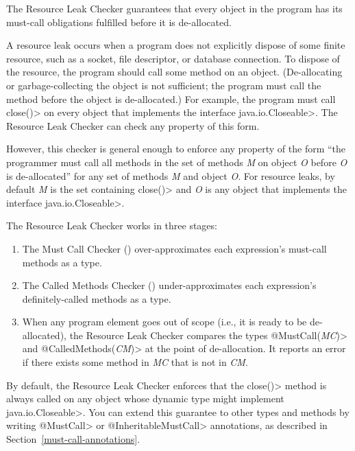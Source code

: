 \htmlhr
{}

The Resource Leak Checker guarantees that every object in the program has
its must-call obligations fulfilled before it is de-allocated.

A resource leak occurs when a program does not explicitly dispose of some
finite resource, such as a socket, file descriptor, or database connection.
To dispose of the resource, the program should call some method on an
object.  (De-allocating or garbage-collecting the object is not sufficient;
the program must call the method before the object is de-allocated.)  For
example, the program must call \<close()> on every object that implements
the interface \<java.io.Closeable>.  The Resource Leak Checker can check
any property of this form.

However, this checker
is general enough to enforce any property of the form ``the programmer must call
all methods in the set of methods \emph{M} on object \emph{O} before \emph{O}
is de-allocated'' for any set of methods \emph{M} and object \emph{O}.
For resource leaks, by default \emph{M} is the set containing \<close()> and \emph{O}
is any object that implements the interface \<java.io.Closeable>.

The Resource Leak Checker works in three stages:
\begin{enumerate}
\item The Must Call Checker ()
over-approximates each expression's must-call methods as a
 type.
\item The Called Methods Checker ()
under-approximates each expression's definitely-called methods as a
 type.
\item When any program element goes out of scope (i.e., it is ready to be de-allocated), the Resource
Leak Checker compares the types \<@MustCall(\emph{MC})> and \<@CalledMethods(\emph{CM})> at the point of de-allocation.
It reports an error
if there exists some method in \emph{MC} that is not in \emph{CM}.
\end{enumerate}

By default, the Resource Leak Checker enforces that the \<close()> method is always
called on any object whose dynamic type might implement \<java.io.Closeable>.
You can extend this guarantee to other types and methods by writing
\<@MustCall> or \<@InheritableMustCall> annotations, as described in
Section~\ref{must-call-annotations}.


